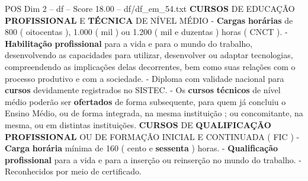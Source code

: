 \begin{textsample}{POS Dim 2 – df – Score 18.00 – df/df\_em\_54.txt}  \label{ex:f2_pos_129}
\textbf{CURSOS} DE EDUCAÇÃO \textbf{PROFISSIONAL} E \textbf{TÉCNICA} DE NÍVEL MÉDIO - \textbf{Cargas} \textbf{horárias} de 800 ( oitocentas ), 1.000 ( mil ) ou 1.200 ( mil e duzentas ) horas ( CNCT ). - \textbf{Habilitação} \textbf{profissional} para a vida e para o mundo do trabalho, desenvolvendo as capacidades para utilizar, desenvolver ou adaptar tecnologias, compreendendo as implicações delas decorrentes, bem como suas relações com o processo produtivo e com a sociedade. - Diploma com validade nacional para \textbf{cursos} devidamente registrados no SISTEC. - Os \textbf{cursos} \textbf{técnicos} de nível médio poderão ser \textbf{ofertados} de forma subsequente, para quem já concluiu o Ensino Médio, ou de forma integrada, na mesma instituição ; ou concomitante, na mesma, ou em distintas instituições. \textbf{CURSOS} DE \textbf{QUALIFICAÇÃO} \textbf{PROFISSIONAL} OU DE FORMAÇÃO INICIAL E CONTINUADA ( FIC ) - \textbf{Carga} \textbf{horária} mínima de 160 ( cento e \textbf{sessenta} ) horas. - \textbf{Qualificação} \textbf{profissional} para a vida e para a inserção ou reinserção no mundo do trabalho. - Reconhecidos por meio de certificado.

\end{textsample}
